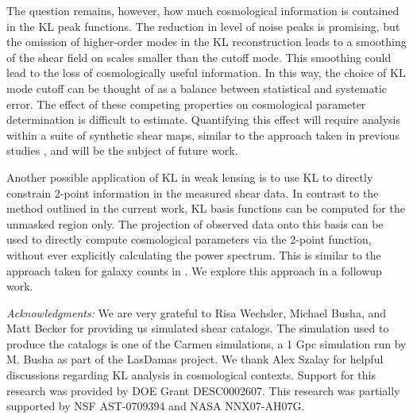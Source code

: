 \documentclass[twocolumn]{emulateapj}
\begin{document}
The question remains, however, how much cosmological information is contained
in the KL peak functions.  The reduction in level of noise peaks is promising,
but the omission of higher-order modes in the KL reconstruction leads to 
a smoothing of the shear field on scales smaller than the cutoff mode.
This smoothing could lead to the loss of cosmologically useful information.
In this way, the choice of KL mode cutoff can be thought of as a balance 
between statistical and systematic error.
The effect of these competing properties on cosmological
parameter determination is difficult to estimate.  Quantifying this effect
will require analysis within a suite of synthetic shear maps, similar to the
approach taken in previous studies \citep[e.g.][]{Dietrich10,Kratochvil10}, 
and will be the subject of future work.

Another possible application of KL in weak lensing is to use KL to 
directly constrain 2-point information in the measured shear data.  
In contrast to the method outlined in the current work, 
KL basis functions can be computed for the unmasked region only.
The projection of observed data onto this basis can be used to 
directly compute cosmological parameters via the 2-point function, 
without ever explicitly calculating the power spectrum.  
This is similar to the approach taken for galaxy counts
in \citet{Vogeley96}.  We explore this approach in a followup work.
 
{\it Acknowledgments:} 
We are very grateful to Risa Wechsler, Michael Busha, and Matt Becker for 
providing us simulated shear catalogs.  The simulation used to produce the 
catalogs is one of the Carmen simulations, a 1 Gpc simulation run by M. Busha 
as part of the LasDamas project. 
We thank Alex Szalay for helpful discussions regarding KL analysis in 
cosmological contexts.
Support for this research was provided by DOE Grant DESC0002607.
This research was partially supported by NSF AST-0709394 and NASA NNX07-AH07G.


\end{document}
